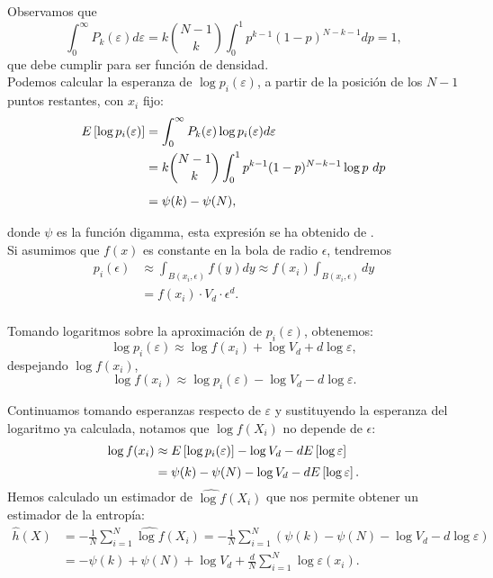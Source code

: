 \documentclass[12pt,a4paper]{report} %
\let\mathbb\relax
\theoremstyle{definition}
\begin{document}
Observamos que \[
\int_0^{\infty} P_k(\varepsilon)d\varepsilon = k\binom{N-1}{k} \int_0^1 p^{k-1}(1-p)^{N-k-1}dp = 1,
\]que debe cumplir para ser función de densidad.\\

Podemos calcular la esperanza de $\log p_i (\varepsilon)$, a partir de la posición de los $N-1$ puntos restantes, con $x_i$ fijo:
\begin{align*}
\mathbb{E} \left[\log p_i(\epsilon)\right ] &= \int_0^\infty P_k(\varepsilon) \log p_i(\varepsilon) d\varepsilon\\ &=  k\binom{N-1}{k} \int_0^1 p^{k-1}(1-p)^{N-k-1}\log p\ dp\\[5pt] &= \psi (k) - \psi(N),
\end{align*}

donde $\psi$ es la función digamma, esta expresión se ha obtenido de \cite{kraskov}.\\ 

Si asumimos que $f(x)$ es constante en la bola de radio $\epsilon$, tendremos \begin{align*}
p_i(\epsilon) &\approx \int_{B(x_i,\epsilon)}f(y)dy\approx f(x_i) \int_{B(x_i,\epsilon)}dy\\[5pt] &= f(x_i)\cdot V_d \cdot \epsilon^d.\\[-5pt]
\end{align*}

Tomando logaritmos sobre la aproximación de $p_i(\varepsilon)$, obtenemos:\[
\log p_i(\varepsilon) \approx \log f(x_i) + \log V_d + d \log \varepsilon, 
\]
despejando $\log f(x_i)$,\[
\log f(x_i) \approx  \log p_i(\varepsilon) - \log V_d - d \log \varepsilon.
\]

Continuamos tomando esperanzas respecto de $\varepsilon$ y sustituyendo la esperanza del logaritmo ya calculada, notamos que $\log f(X_i)$ no depende de $\epsilon$:\begin{align*}
\log f(x_i) &\approx \mathbb{E}\left[\log p_i(\epsilon)\right] - \log V_d  - d \mathbb{E} \left[\log \varepsilon\right]\\[2pt] &= \psi (k) - \psi (N) - \log V_d  - d \mathbb{E} \left[\log \varepsilon\right].\\[-5pt]
\end{align*}

Hemos calculado un estimador de $\widehat{\log f} (X_i)$ que nos permite obtener un estimador de la entropía:
\begin{align}
  \widehat{h}(X) &= - \frac{1}{N} \sum_{i=1}^N\widehat{\log f} (X_i) = - \frac{1}{N} \sum_{i=1}^N\left (\psi (k) - \psi (N) - \log V_d  - d\log \varepsilon \right ) \nonumber \\
  &= - \psi (k) + \psi (N) + \log V_d + \frac{d}{N} \sum_{i=1}^N \log \varepsilon (x_i). \label{eq:est_ent}
\end{align}\\[-5pt]
\end{document}
